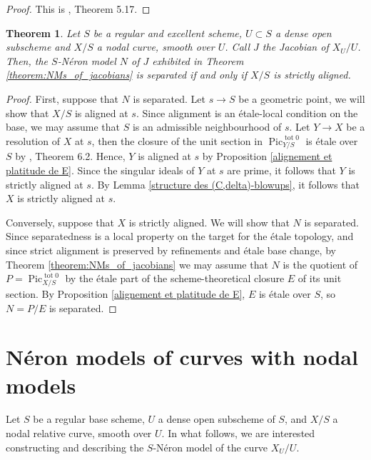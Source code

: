 \documentclass[a4paper,12pt]{amsart} %
\numberwithin{equation}{subsection}
\newcommand{\on}[1]{\operatorname{#1}}
\theoremstyle{definition}
\theoremstyle{plain}%
\newtheorem{theorem}[definition]{Theorem}
\theoremstyle{remark}
\begin{document}
\begin{proof}
	This is \cite{Holmes}, Theorem 5.17.
\end{proof}

\begin{theorem}\label{theorem:separatedness_of_NM_jac_iff_strictly_aligned}
Let $S$ be a regular and excellent scheme, $U\subset S$ a dense open subscheme and $X/S$ a nodal curve, smooth over $U$. Call $J$ the Jacobian of $X_U/U$. Then, the $S$-Néron model $N$ of $J$ exhibited in Theorem \ref{theorem:NMs_of_jacobians} is separated if and only if $X/S$ is strictly aligned.
\end{theorem}

\begin{proof}
First, suppose that $N$ is separated. Let $s \to S$ be a geometric point, we will show that $X/S$ is aligned at $s$. Since alignment is an étale-local condition on the base, we may assume that $S$ is an admissible neighbourhood of $s$. Let $Y \to X$ be a resolution of $X$ at $s$, then the closure of the unit section in $\operatorname{Pic}^{\on{tot}0}_{Y/S}$ is étale over $S$ by \cite{Holmes}, Theorem 6.2. Hence, $Y$ is aligned at $s$ by Proposition \ref{alignement et platitude de E}. Since the singular ideals of $Y$ at $s$ are prime, it follows that $Y$ is strictly aligned at $s$. By Lemma \ref{structure des (C,delta)-blowups}, it follows that $X$ is strictly aligned at $s$.

Conversely, suppose that $X$ is strictly aligned. We will show that $N$ is separated. Since separatedness is a local property on the target for the étale topology, and since strict alignment is preserved by refinements and étale base change, by Theorem \ref{theorem:NMs_of_jacobians} we may assume that $N$ is the quotient of $P=\operatorname{Pic}^{\on{tot}0}_{X/S}$ by the étale part of the scheme-theoretical closure $E$ of its unit section. By Proposition \ref{alignement et platitude de E}, $E$ is étale over $S$, so $N=P/E$ is separated.
\end{proof}




\section{N\'eron models of curves with nodal models}\label{NMs_of_curves_with_nodal_models}

Let $S$ be a regular base scheme, $U$ a dense open subscheme of $S$, and $X/S$ a nodal relative curve, smooth over $U$. In what follows, we are interested constructing and describing the $S$-Néron model of the curve $X_U/U$. 
	
\end{document}
